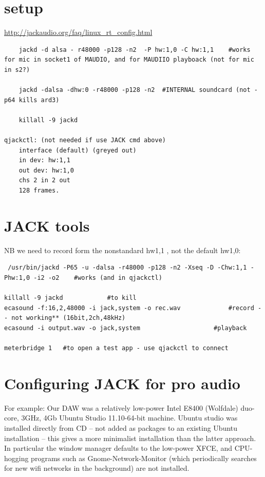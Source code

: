 \documentclass[oneside,english]{scrbook}
\begin{document}
\section{setup}
\url{http://jackaudio.org/faq/linux_rt_config.html}

\begin{lstlisting}
    jackd -d alsa - r48000 -p128 -n2  -P hw:1,0 -C hw:1,1    #works for mic in socket1 of MAUDIO, and for MAUDIIO playboack (not for mic in s2?)

	jackd -dalsa -dhw:0 -r48000 -p128 -n2  #INTERNAL soundcard (not -p64 kills ard3)
	
	killall -9 jackd

qjackctl: (not needed if use JACK cmd above)
	interface (default) (greyed out)
	in dev: hw:1,1
	out dev: hw:1,0	
	chs 2 in 2 out
	128 frames.
\end{lstlisting}

\section{JACK tools}
NB we need to record form the nonstandard hw1,1 , not the default hw1,0:

\begin{lstlisting}
 /usr/bin/jackd -P65 -u -dalsa -r48000 -p128 -n2 -Xseq -D -Chw:1,1 -Phw:1,0 -i2 -o2    #works (and in qjackctl)

killall -9 jackd			#to kill
ecasound -f:16,2,48000 -i jack,system -o rec.wav  			 #record -- not working** (16bit,2ch,48kHz)
ecasound -i output.wav -o jack,system 					 #playback

meterbridge 1   #to open a test app - use qjackctl to connect
\end{lstlisting}

\section{Configuring JACK for pro audio}

For example: Our DAW was a relatively low-power Intel E8400 (Wolfdale) duo-core, 3GHz, 4Gb Ubuntu Studio 11.10-64-bit machine.   Ubuntu studio was installed directly from CD -- not added as packages to an existing Ubuntu installation -- this gives a more minimalist installation than the latter approach.  In particular the window manager defaults to the low-power XFCE, and CPU-hogging programs such as Gnome-Network-Monitor (which periodically searches for new wifi networks in the background) are not installed.
\end{document}
